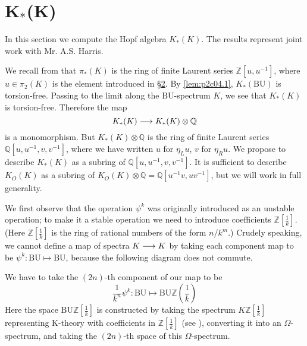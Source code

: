 \documentclass[../main]{subfiles}
\begin{document}
\label{sec:p2c13} %

\chapter{K$_\ast$(K)}

In this section we compute the Hopf algebra $K_\ast(K)$. The results represent joint work with Mr. A.S. Harris.

We recall from \cite{atiyahbott} that $\pi_\ast(K)$ is the ring of finite Laurent series $\mathbb{Z}[u, u^{-1}]$, where $u\in\pi_2(K)$ is the element introduced in \hyperref[sec:p2c2]{\S 2}. By \eqref{lem:p2c04.1}, $K_\ast(\mathrm{BU})$ is torsion-free. Passing to the limit along the $\mathrm{BU}$-spectrum $K$, we see that $K_\ast(K)$ is torsion-free. Therefore the map $$K_\ast(K)\longrightarrow K_\ast(K)\otimes \mathbb{Q}$$ is a monomorphism. But $K_\ast(K)\otimes \mathbb{Q}$ is the ring of finite Laurent series $\mathbb{Q}[u,u^{-1},v,v^{-1}]$, where we have written $u$ for $\eta_L u$, $v$ for $\eta_R u$. We propose to describe $K_\ast(K)$ as a subring of $\mathbb{Q}[u,u^{-1},v,v^{-1}]$. It is sufficient to describe $K_O(K)$ as a subring of $K_O(K)\otimes\mathbb{Q}=\mathbb{Q}[u^{-1}v,uv^{-1}]$, but we will work in full generality. 

We first observe that the operation $\psi^k$ was originally introduced as an unstable operation; to make it a stable operation we need to introduce coefficients $\mathbb{Z}\left[\frac{1}{k}\right]$. (Here $\mathbb{Z}\left[\frac{1}{k}\right]$ is the ring of rational numbers of the form $n/k^m$.) Crudely speaking, we cannot define a map of spectra $K\longrightarrow K$ by taking each component map to be $\psi^k: \mathrm{BU}\mapsto \mathrm{BU}$, because the following diagram does not commute.
\begin{center}
\end{center}
We have to take the $(2n)$-th component of our map to be $$\frac{1}{k^n}\psi^k:\mathrm{BU}\mapsto \mathrm{BU}\mathbb{Z}\left(\frac{1}{k}\right)$$
Here the space $\mathrm{BU}\mathbb{Z}\left[\frac{1}{k}\right]$ is constructed by taking the spectrum $K\mathbb{Z}\left[\frac{1}{k}\right]$ representing K-theory with coefficients in $\mathbb{Z}\left[\frac{1}{k}\right]$ (see \cite{adams2}), converting it into an $\Omega$-spectrum, and taking the $(2n)$-th space of this $\Omega$-spectrum. 
\end{document}
